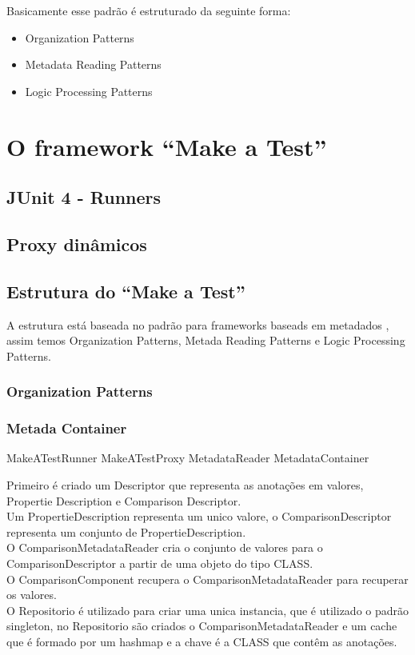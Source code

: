 \documentclass{abnt}
\begin{document}
Basicamente esse padrão é estruturado da seguinte forma:\\

\begin{itemize}
	\item Organization Patterns
	\item Metadata Reading Patterns
	\item Logic Processing Patterns
\end{itemize}

\chapter{O framework ``Make a Test''}
\section{JUnit 4 - Runners}
\section{Proxy dinâmicos}
\section{Estrutura do ``Make a Test''}
A estrutura está baseada no padrão para frameworks baseads em metadados \cite{GUERRA-PATTERN}, assim temos Organization Patterns, Metada Reading Patterns e Logic Processing Patterns.
\subsection{Organization Patterns}

\subsection{Metada Container}
MakeATestRunner
MakeATestProxy
MetadataReader
MetadataContainer


Primeiro é criado um Descriptor que representa as anotações em valores, Propertie Description e Comparison Descriptor.\\
Um PropertieDescription representa um unico valore, o ComparisonDescriptor representa um conjunto de PropertieDescription.\\

O ComparisonMetadataReader cria o conjunto de valores para o ComparisonDescriptor a partir de uma objeto do tipo CLASS.\\

O ComparisonComponent recupera o ComparisonMetadataReader para recuperar os valores.\\

O Repositorio é utilizado para criar uma unica instancia, que é utilizado o padrão singleton, no Repositorio são criados o ComparisonMetadataReader e um cache que é formado por um hashmap e a chave é a CLASS que contêm as anotações.



\end{document}
